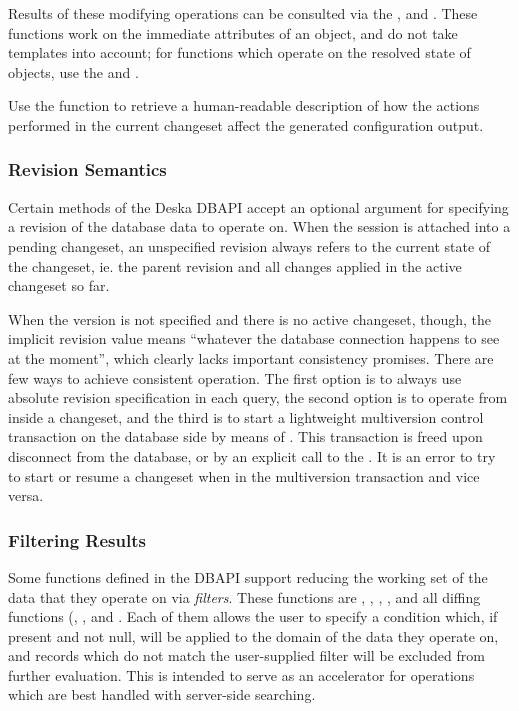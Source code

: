 \documentclass{article}
\begin{document}
Results of these modifying operations can be consulted via the ,
 and .  These functions work on the
immediate attributes of an object, and do not take templates into account; for functions which operate on the resolved
state of objects, use the  and
.

Use the  function to retrieve a human-readable description of how the actions performed in
the current changeset affect the generated configuration output.

\subsubsection{Revision Semantics}
\label{sec:api-revision-semantics}

Certain methods of the Deska DBAPI accept an optional argument for specifying a revision of the database data to
operate on.  When the session is attached into a pending changeset, an unspecified revision always refers to the current
state of the changeset, ie. the parent revision and all changes applied in the active changeset so far.

When the version is not specified and there is no active changeset, though, the implicit revision value means ``whatever
the database connection happens to see at the moment'', which clearly lacks important consistency promises.  There are
few ways to achieve consistent operation.  The first option is to always use absolute revision specification in each
query,  the second option is to operate from inside a changeset, and the third is to start a lightweight multiversion
control transaction on the database side by means of .  This transaction is freed upon
disconnect from the database, or by an explicit call to the .  It is an error to try to start
or resume a changeset when in the multiversion transaction and vice versa.

\subsubsection{Filtering Results}
\label{sec:api-filters}

Some functions defined in the DBAPI support reducing the working set of the data that they operate on via {\em filters}.
These functions are , ,
, ,  and all
diffing functions (, ,
 and .  Each of them
allows the user to specify a condition which, if present and not null, will be applied to the domain of the data they
operate on, and records which do not match the user-supplied filter will be excluded from further evaluation.  This is
intended to serve as an accelerator for operations which are best handled with server-side searching.
\end{document}
